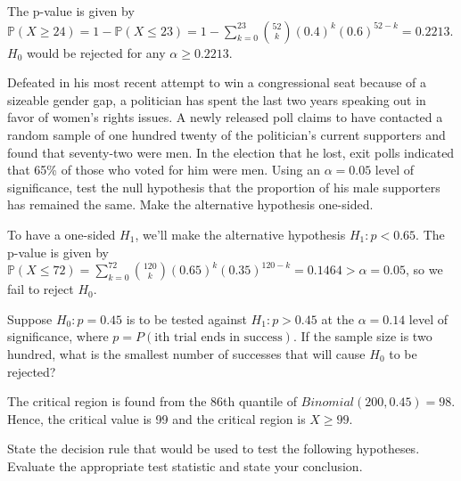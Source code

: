 \documentclass{article}
\renewcommand{\P}{\mathbb{P}}
\begin{document}
\begin{probset}
\begin{prob}[\textbf{6.3.1}]
\begin{subprobset}
\begin{subprob}
        \begin{soln}
            The p-value is given by $\P(X \geq 24) = 1 - \P(X \leq 23) = 1 - \sum_{k=0}^{23} \binom{52}{k} (0.4)^k (0.6)^{52-k} = 0.2213$. $H_0$ would be rejected for any $\alpha \geq 0.2213$.
        \end{soln}
    \end{subprob}
    \end{subprobset}
\end{prob}

\begin{prob}[\textbf{6.3.3}]
    Defeated in his most recent attempt to win a congressional seat because of a sizeable gender gap, a politician has spent the last two years speaking out in favor of women's rights issues. A newly released poll claims to have contacted a random sample of one hundred twenty of the politician's current supporters and found that seventy-two were men. In the election that he lost, exit polls indicated that 65\% of those who voted for him were men. Using an $\alpha = 0.05$ level of significance, test the null hypothesis that the proportion of his male supporters has remained the same. Make the alternative hypothesis one-sided.

    \begin{soln}
        To have a one-sided $H_1$, we'll make the alternative hypothesis $H_1: p < 0.65$. The p-value is given by $\P(X \leq 72) = \sum_{k=0}^{72} \binom{120}{k} (0.65)^k (0.35)^{120-k} = 0.1464 > \alpha = 0.05$, so we fail to reject $H_0$.
    \end{soln}
\end{prob}

\begin{prob}[\textbf{6.3.4}]
    Suppose $H_0: p = 0.45$ is to be tested against $H_1: p > 0.45$ at the $\alpha = 0.14$ level of significance, where $p = P(\text{ith trial ends in success})$. If the sample size is two hundred, what is the smallest number of successes that will cause $H_0$ to be rejected?

    \begin{soln}
        The critical region is found from the 86th quantile of $Binomial(200, 0.45) = 98$. Hence, the critical value is 99 and the critical region is $X \geq 99$.
    \end{soln}
\end{prob}

\newpage

\begin{prob}[\textbf{6.2.1}]
    State the decision rule that would be used to test the following hypotheses. Evaluate the appropriate test statistic and state your conclusion.


\end{prob}
\end{probset}
\end{document}
